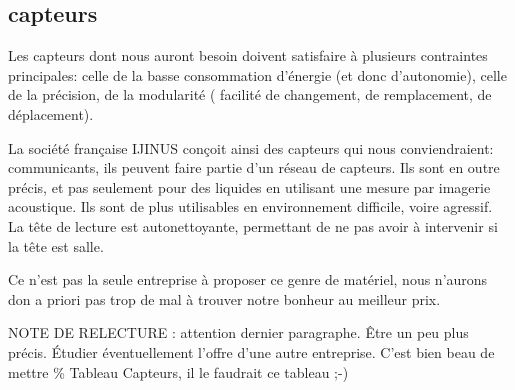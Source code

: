 \subsection{capteurs}

Les capteurs dont nous auront besoin doivent satisfaire à plusieurs
contraintes principales: celle de la basse consommation d'énergie
(et donc d'autonomie), celle de la précision, de la modularité (
facilité de changement, de remplacement, de déplacement).

La société française IJINUS conçoit ainsi des capteurs qui nous
conviendraient: communicants, ils peuvent faire partie d'un
réseau de capteurs. Ils sont en outre précis, et pas seulement
pour des liquides en utilisant une mesure par imagerie acoustique.
Ils sont de plus utilisables en environnement difficile, voire agressif.
La tête de lecture est autonettoyante, permettant de ne pas avoir
à intervenir si la tête est salle.

\begin{figure}
\begin{center}


\end{center}
\end{figure}

Ce n'est pas la seule entreprise à proposer ce genre de matériel, nous
n'aurons don a priori pas trop de mal à trouver notre bonheur au meilleur
prix.

NOTE DE RELECTURE : attention dernier paragraphe. Être un peu plus précis.
Étudier éventuellement l'offre d'une autre entreprise. C'est bien beau de
mettre \% Tableau Capteurs, il le faudrait ce tableau ;-)
